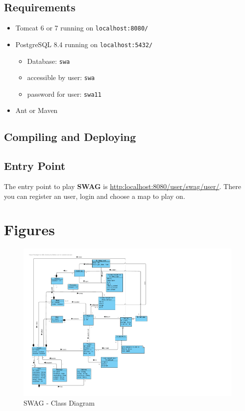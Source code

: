\documentclass[11pt]{article}
\begin{document}
\subsection{Requirements}

\begin{itemize}
\item Tomcat 6 or 7 running on \texttt{localhost:8080/}
\item PostgreSQL 8.4 running on \texttt{localhost:5432/}
	\begin{itemize}
	\item Database: \texttt{swa}
	\item accessible by user: \texttt{swa}
	\item password for user: \texttt{swa11}
	\end{itemize}
\item Ant or Maven
\end{itemize}

\subsection{Compiling and Deploying}

\subsection{Entry Point}

The entry point to play \textbf{SWAG} is \href{http:localhost:8080/user/swag/user/}{http:localhost:8080/user/swag/user/}. There you can register an user, login and choose a map to play on.

\newpage

\appendix
\section{Figures}

\begin{figure}[h]
\center
\includegraphics[scale=0.9]{diagrams/SWAG_Class_Diagram.pdf}
\caption{SWAG - Class Diagram}
\label{fig:class}
\end{figure}
\end{document}
